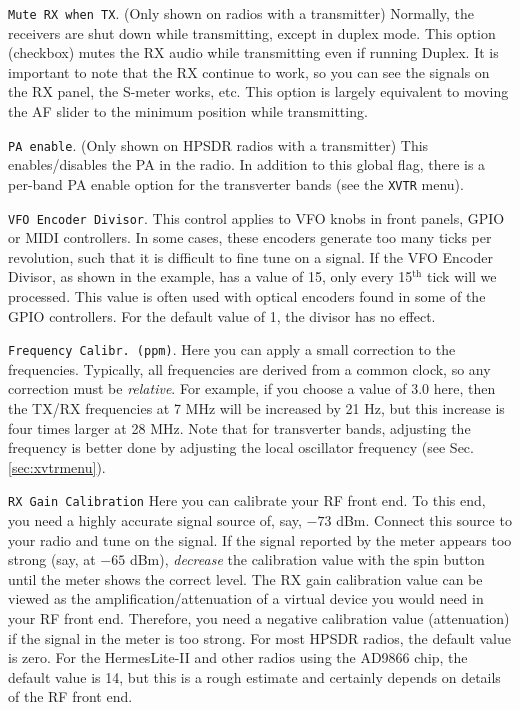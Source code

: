 \documentclass[12pt]{book}
\def\rett#1{\texttt{\color{red}#1}}
\def\bltt#1{\texttt{\color{blue}#1}}
\begin{document}
\rett{Mute RX when TX}. (Only shown on radios with a transmitter)
Normally, the receivers are shut down while transmitting, except
in duplex mode. This option (checkbox) mutes the RX audio while transmitting even if running
Duplex. It is important
to note that the RX continue to work, so you can see the signals on the RX panel, the
S-meter works, etc. This option is largely equivalent to moving the AF slider to the
minimum position while transmitting.

\rett{PA enable}. (Only shown on HPSDR radios with a transmitter)
This enables/disables the PA in the radio. In addition to this global
flag, there is a per-band PA enable option for the transverter bands (see the \bltt{XVTR}
menu).

\rett{VFO Encoder Divisor}. This control applies to VFO knobs in front panels, GPIO
or MIDI controllers. In some cases, these encoders generate too many ticks per revolution,
such that it is difficult to fine tune on a signal.
If the VFO Encoder Divisor, as shown in the example, has a value of
15, only every 15$^\textrm{th}$ tick will we processed. This value is often used with
optical encoders found in some of the GPIO controllers. For the default value of 1,
the divisor has no effect.

\rett{Frequency~Calibr.~(ppm)}. Here you can apply a small correction to the frequencies.
Typically, all frequencies are derived from a common clock, so any correction must
be \textit{relative}. For example, if you choose a value of 3.0 here, then the
TX/RX frequencies at 7 MHz will be increased by 21 Hz, but this increase is
four times larger at 28 MHz. Note that for transverter bands, adjusting the frequency
is better done by adjusting the local oscillator frequency (see Sec. \ref{sec:xvtrmenu}).

\rett{RX Gain Calibration} Here you can calibrate your RF front end. To this end, you
need a highly accurate signal source of, say, $-73$ dBm. Connect this source to your
radio and tune on the signal. If the signal reported by the meter
appears too strong (say, at $-65$ dBm),
\textit{decrease} the
calibration value with the spin button until the meter shows the correct level.
The RX gain calibration value can be viewed as the  amplification/attenuation of
a virtual device you
would need in your RF front end. Therefore, you need a negative calibration value (attenuation)
if the signal in the meter is too strong. For most HPSDR radios, the default value is
zero. For the HermesLite-II and other radios using the AD9866 chip, the default
value is 14, but this is a rough estimate and certainly depends on details of
the RF front end.
\end{document}
